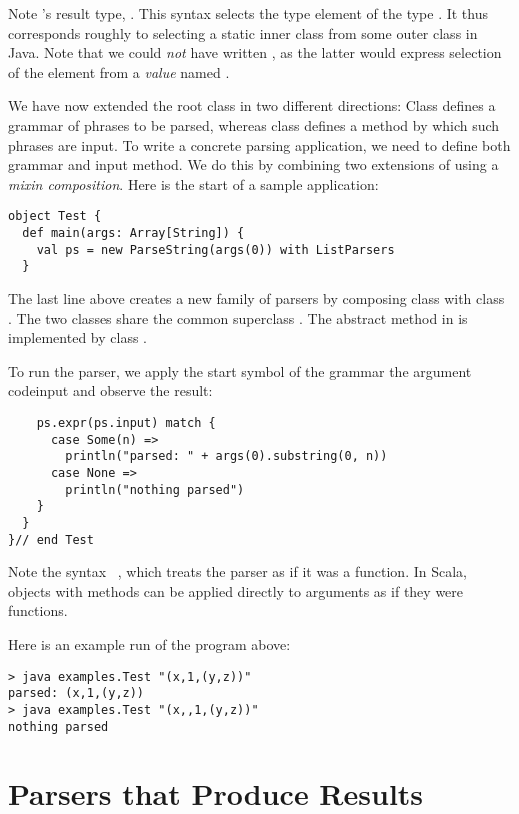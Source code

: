 {{Note 's result type, . This syntax
selects the type element  of the type . It
thus corresponds roughly to selecting a static inner class from some
outer class in Java. Note that we could {\em not} have written
, as the latter would express selection of the
 element from a {\em value} named .

We have now extended the root class  in two different
directions: Class  defines a grammar of phrases to
be parsed, whereas class  defines a method by which
such phrases are input. To write a concrete parsing application, we
need to define both grammar and input method. We do this by combining
two extensions of  using a {\em mixin composition}.
Here is the start of a sample application:
\begin{lstlisting}
object Test {
  def main(args: Array[String]) {
    val ps = new ParseString(args(0)) with ListParsers
  }
\end{lstlisting}
The last line above creates a new family of parsers by composing class
 with class . The two classes
share the common superclass . The abstract method
 in  is implemented by class .

To run the parser, we apply the start symbol of the grammar
 the argument code{input} and observe the result:
\begin{lstlisting}
    ps.expr(ps.input) match {
      case Some(n) =>
        println("parsed: " + args(0).substring(0, n))
      case None =>
        println("nothing parsed")
    }
  }
}// end Test
\end{lstlisting}
Note the syntax ~, which treats the 
parser as if it was a function. In Scala, objects with 
methods can be applied directly to arguments as if they were functions.

Here is an example run of the program above:
\begin{lstlisting}
> java examples.Test "(x,1,(y,z))"
parsed: (x,1,(y,z))
> java examples.Test "(x,,1,(y,z))"
nothing parsed
\end{lstlisting}

\section{\label{sec:parsers-results}Parsers that Produce Results}

}}
